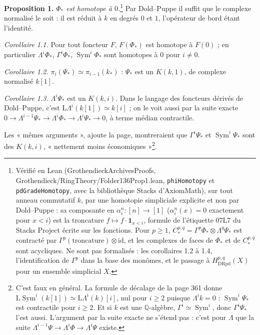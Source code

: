 \documentclass[11pt,a4paper]{article}
\begin{document}
\textbf{Proposition 1.} \emph{$\Phi_*$ est homotope à $0$.}\footnote{Vérifié en
Lean (GrothendieckArchivesProofs, Grothendieck/RingTheory/Folder136Prop1.lean,
\texttt{phiHomotopy} et \texttt{pdGradeHomotopy}, avec la bibliothèque Stacks
d'AxiomMath), sur tout anneau commutatif $k$, par une homotopie simpliciale
explicite et non par Dold–Puppe : sa composante en $\alpha^n_i : [n] \to [1]$
($\alpha^n_i(x) = 0$ exactement pour $x < i$) est la troncature
$f \mapsto f \cdot \mathbf{1}_{x < i}$, formule de l'étiquette 07L7 du Stacks
Project écrite sur les fonctions. Pour $p \geq 1$, $C^{p,q}_* =
\Gamma^p\Phi_* \otimes \Lambda^q\Psi_*$ est contracté par
$\Gamma^p(\text{troncature}) \otimes \mathrm{id}$, et les complexes de faces de
$\Phi_*$ et de $C^{p,q}_*$ sont acycliques. Ne sont pas formalisés : les
corollaires 1.2 à 1.4, l'identification de $\Gamma^p$ dans la base des monômes,
et le passage à $H^{p,q}_{\mathrm{DRpd}}(X)$ pour un ensemble simplicial $X$.}
Par Dold–Puppe il
suffit que le complexe normalisé le soit : il est réduit à $k$ en degrés $0$ et
$1$, l'opérateur de bord étant l'identité.

\emph{Corollaire 1.1.} Pour tout foncteur $F$, $F(\Phi_*)$ est homotope à
$F(0)$ ; en particulier $\Lambda^i\Phi_*$, $\Gamma^i\Phi_*$,
$\operatorname{Sym}^i\Phi_*$ sont homotopes à $0$ pour $i \neq 0$.

\emph{Corollaire 1.2.} $\pi_i(\Psi_*) \simeq \pi_{i-1}(k_*)$ : $\Psi_*$ est un
$K(k,1)$, de complexe normalisé $k[1]$.

\emph{Corollaire 1.3.} $\Lambda^i\Psi_*$ est un $K(k, i)$. Dans le langage des
foncteurs dérivés de Dold–Puppe, c'est $\mathrm{L}\Lambda^i(k[1]) \simeq k[i]$ ;
on le voit aussi par la suite exacte $0 \to \Lambda^{i-1}\Psi_* \to
\Lambda^i\Phi_* \to \Lambda^i\Psi_* \to 0$, à terme médian contractile.

Les « mêmes arguments », ajoute la page, montreraient que $\Gamma^i\Psi_*$ et
$\operatorname{Sym}^i\Psi_*$ sont des $K(k,i)$, « nettement moins
économiques »\footnote{C'est faux en général. La formule de décalage de la page
361 donne $\mathrm{L}\operatorname{Sym}^i(k[1]) \simeq
\mathrm{L}\Lambda^i(k)[i]$, nul pour $i \geq 2$ puisque $\Lambda^i k = 0$ :
$\operatorname{Sym}^i\Psi_*$ est contractile pour $i \geq 2$. Et si $k$ est une
$\mathbb{Q}$-algèbre, $\Gamma^i \simeq \operatorname{Sym}^i$, donc
$\Gamma^i\Psi_*$ l'est aussi. L'argument par la suite exacte ne s'étend pas :
c'est pour $\Lambda$ que la suite $\Lambda^{i-1}\Psi \to \Lambda^i\Phi \to
\Lambda^i\Psi$ existe.}.
\end{document}
